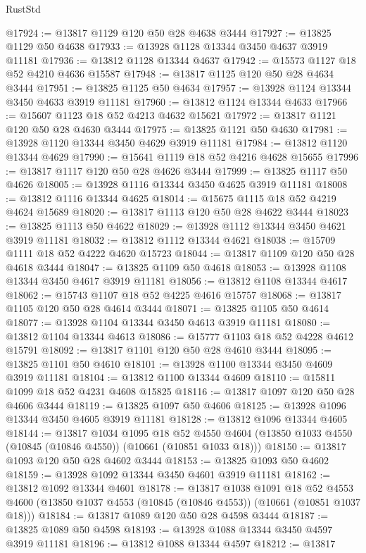 \begin{lexlean}{RustStd}
\begin{coremodule}
@17924 := @13817 @1129 @120 @50 @28 @4638 @3444
@17927 := @13825 @1129 @50 @4638
@17933 := @13928 @1128 @13344 @3450 @4637 @3919 @11181
@17936 := @13812 @1128 @13344 @4637
@17942 := @15573 @1127 @18 @52 @4210 @4636 @15587
@17948 := @13817 @1125 @120 @50 @28 @4634 @3444
@17951 := @13825 @1125 @50 @4634
@17957 := @13928 @1124 @13344 @3450 @4633 @3919 @11181
@17960 := @13812 @1124 @13344 @4633
@17966 := @15607 @1123 @18 @52 @4213 @4632 @15621
@17972 := @13817 @1121 @120 @50 @28 @4630 @3444
@17975 := @13825 @1121 @50 @4630
@17981 := @13928 @1120 @13344 @3450 @4629 @3919 @11181
@17984 := @13812 @1120 @13344 @4629
@17990 := @15641 @1119 @18 @52 @4216 @4628 @15655
@17996 := @13817 @1117 @120 @50 @28 @4626 @3444
@17999 := @13825 @1117 @50 @4626
@18005 := @13928 @1116 @13344 @3450 @4625 @3919 @11181
@18008 := @13812 @1116 @13344 @4625
@18014 := @15675 @1115 @18 @52 @4219 @4624 @15689
@18020 := @13817 @1113 @120 @50 @28 @4622 @3444
@18023 := @13825 @1113 @50 @4622
@18029 := @13928 @1112 @13344 @3450 @4621 @3919 @11181
@18032 := @13812 @1112 @13344 @4621
@18038 := @15709 @1111 @18 @52 @4222 @4620 @15723
@18044 := @13817 @1109 @120 @50 @28 @4618 @3444
@18047 := @13825 @1109 @50 @4618
@18053 := @13928 @1108 @13344 @3450 @4617 @3919 @11181
@18056 := @13812 @1108 @13344 @4617
@18062 := @15743 @1107 @18 @52 @4225 @4616 @15757
@18068 := @13817 @1105 @120 @50 @28 @4614 @3444
@18071 := @13825 @1105 @50 @4614
@18077 := @13928 @1104 @13344 @3450 @4613 @3919 @11181
@18080 := @13812 @1104 @13344 @4613
@18086 := @15777 @1103 @18 @52 @4228 @4612 @15791
@18092 := @13817 @1101 @120 @50 @28 @4610 @3444
@18095 := @13825 @1101 @50 @4610
@18101 := @13928 @1100 @13344 @3450 @4609 @3919 @11181
@18104 := @13812 @1100 @13344 @4609
@18110 := @15811 @1099 @18 @52 @4231 @4608 @15825
@18116 := @13817 @1097 @120 @50 @28 @4606 @3444
@18119 := @13825 @1097 @50 @4606
@18125 := @13928 @1096 @13344 @3450 @4605 @3919 @11181
@18128 := @13812 @1096 @13344 @4605
@18144 := @13817
    @1034
    @1095
    @18
    @52
    @4550
    @4604
    (@13850 @1033 @4550 (@10845 (@10846 @4550)) (@10661 (@10851 @1033 @18)))
@18150 := @13817 @1093 @120 @50 @28 @4602 @3444
@18153 := @13825 @1093 @50 @4602
@18159 := @13928 @1092 @13344 @3450 @4601 @3919 @11181
@18162 := @13812 @1092 @13344 @4601
@18178 := @13817
    @1038
    @1091
    @18
    @52
    @4553
    @4600
    (@13850 @1037 @4553 (@10845 (@10846 @4553)) (@10661 (@10851 @1037 @18)))
@18184 := @13817 @1089 @120 @50 @28 @4598 @3444
@18187 := @13825 @1089 @50 @4598
@18193 := @13928 @1088 @13344 @3450 @4597 @3919 @11181
@18196 := @13812 @1088 @13344 @4597
@18212 := @13817

\end{coremodule}
\end{lexlean}
